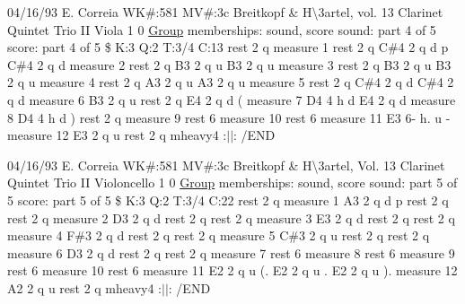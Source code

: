 04/16/93 E. Correia WK\#\+:581 MV\#\+:3c Breitkopf \& H\textbackslash{}3artel, vol. 13 Clarinet Quintet Trio II Viola 1 0 \hyperlink{class_group}{Group} memberships\+: sound, score sound\+: part 4 of 5 score\+: part 4 of 5 \$ K\+:3 Q\+:2 T\+:3/4 C\+:13 rest 2 q measure 1 rest 2 q C\#4 2 q d p C\#4 2 q d measure 2 rest 2 q B3 2 q u B3 2 q u measure 3 rest 2 q B3 2 q u B3 2 q u measure 4 rest 2 q A3 2 q u A3 2 q u measure 5 rest 2 q C\#4 2 q d C\#4 2 q d measure 6 B3 2 q u rest 2 q E4 2 q d ( measure 7 D4 4 h d E4 2 q d measure 8 D4 4 h d ) rest 2 q measure 9 rest 6 measure 10 rest 6 measure 11 E3 6-\/ h. u -\/ measure 12 E3 2 q u rest 2 q mheavy4 \+:$\vert$$\vert$\+: /\+E\+ND

04/16/93 E. Correia WK\#\+:581 MV\#\+:3c Breitkopf \& H\textbackslash{}3artel, Vol. 13 Clarinet Quintet Trio II Violoncello 1 0 \hyperlink{class_group}{Group} memberships\+: sound, score sound\+: part 5 of 5 score\+: part 5 of 5 \$ K\+:3 Q\+:2 T\+:3/4 C\+:22 rest 2 q measure 1 A3 2 q d p rest 2 q rest 2 q measure 2 D3 2 q d rest 2 q rest 2 q measure 3 E3 2 q d rest 2 q rest 2 q measure 4 F\#3 2 q d rest 2 q rest 2 q measure 5 C\#3 2 q u rest 2 q rest 2 q measure 6 D3 2 q d rest 2 q rest 2 q measure 7 rest 6 measure 8 rest 6 measure 9 rest 6 measure 10 rest 6 measure 11 E2 2 q u (. E2 2 q u . E2 2 q u ). measure 12 A2 2 q u rest 2 q mheavy4 \+:$\vert$$\vert$\+: /\+E\+ND 